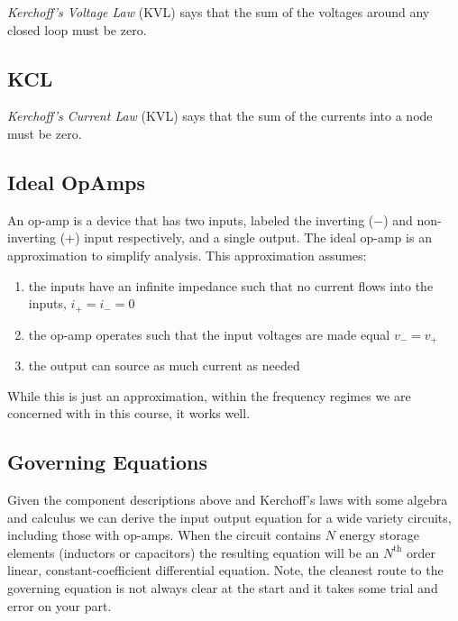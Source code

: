 \textit{Kerchoff's Voltage Law} (KVL) says that the sum of the voltages around any closed loop must be zero.

\subsection*{KCL}

\textit{Kerchoff's Current Law} (KVL) says that the sum of the currents into a node must be zero.

\subsection*{Ideal OpAmps}

An op-amp is a device that has two inputs, labeled the inverting ($-$) and non-inverting ($+$) input respectively, and a single output. The ideal op-amp is an approximation to simplify analysis. This approximation assumes:

\begin{enumerate}
\item the inputs have an infinite impedance such that no current flows into the inputs, $i_+ = i_- = 0$
\item the op-amp operates such that the input voltages are made equal $v_- = v_+$
\item the output can source as much current as needed
\end{enumerate}
 
While this is just an approximation, within the frequency regimes we are concerned with in this course, it works well. 

\subsection*{Governing Equations}

Given the component descriptions above and Kerchoff's laws with some algebra and calculus we can derive the input output equation for a wide variety circuits, including those with op-amps. When the circuit contains $N$ energy storage elements (inductors or capacitors) the resulting equation will be an $N^\text{th}$ order linear, constant-coefficient differential equation. Note, the cleanest route to the governing equation is not always clear at the start and it takes some trial and error on your part.

